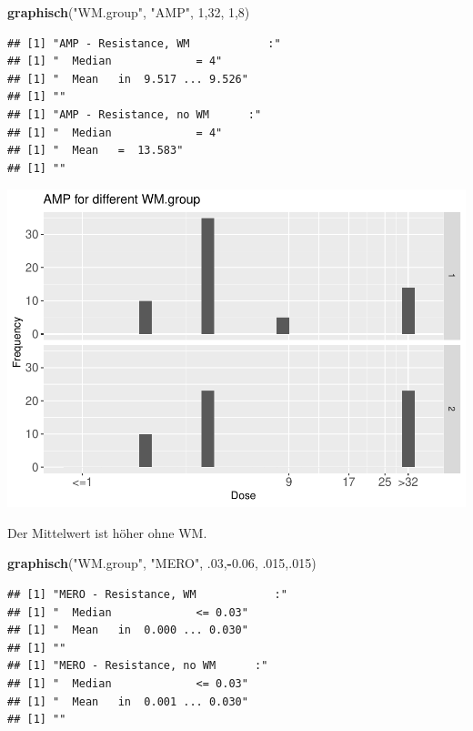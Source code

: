\documentclass[
]{article}
\newenvironment{Shaded}{\begin{snugshade}}{\end{snugshade}}
\newcommand{\DecValTok}[1]{\textcolor[rgb]{0.00,0.00,0.81}{#1}}
\newcommand{\FloatTok}[1]{\textcolor[rgb]{0.00,0.00,0.81}{#1}}
\newcommand{\KeywordTok}[1]{\textcolor[rgb]{0.13,0.29,0.53}{\textbf{#1}}}
\newcommand{\NormalTok}[1]{#1}
\newcommand{\OperatorTok}[1]{\textcolor[rgb]{0.81,0.36,0.00}{\textbf{#1}}}
\newcommand{\StringTok}[1]{\textcolor[rgb]{0.31,0.60,0.02}{#1}}
\begin{document}
\begin{Shaded}
\begin{Highlighting}[]
  \KeywordTok{graphisch}\NormalTok{(}\StringTok{"WM.group"}\NormalTok{, }\StringTok{"AMP"}\NormalTok{, }\DecValTok{1}\NormalTok{,}\DecValTok{32}\NormalTok{, }\DecValTok{1}\NormalTok{,}\DecValTok{8}\NormalTok{)}
\end{Highlighting}
\end{Shaded}

\begin{verbatim}
## [1] "AMP - Resistance, WM            :"
## [1] "  Median             = 4"
## [1] "  Mean   in  9.517 ... 9.526"
## [1] ""
## [1] "AMP - Resistance, no WM      :"
## [1] "  Median             = 4"
## [1] "  Mean   =  13.583"
## [1] ""
\end{verbatim}

\includegraphics{Verteilungen_files/figure-latex/unnamed-chunk-31-1.pdf}

Der Mittelwert ist höher ohne WM.

\begin{Shaded}
\begin{Highlighting}[]
  \KeywordTok{graphisch}\NormalTok{(}\StringTok{"WM.group"}\NormalTok{, }\StringTok{"MERO"}\NormalTok{, }\FloatTok{.03}\NormalTok{,}\OperatorTok{-}\FloatTok{0.06}\NormalTok{, }\FloatTok{.015}\NormalTok{,.}\DecValTok{015}\NormalTok{)}
\end{Highlighting}
\end{Shaded}

\begin{verbatim}
## [1] "MERO - Resistance, WM            :"
## [1] "  Median             <= 0.03"
## [1] "  Mean   in  0.000 ... 0.030"
## [1] ""
## [1] "MERO - Resistance, no WM      :"
## [1] "  Median             <= 0.03"
## [1] "  Mean   in  0.001 ... 0.030"
## [1] ""
\end{verbatim}
\end{document}
